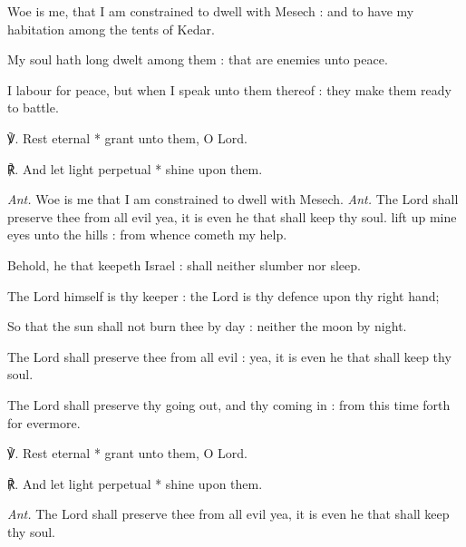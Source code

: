 Woe is me, that I am constrained to dwell with Mesech : and to have my habitation among the tents of Kedar.\par
{}My soul hath long dwelt among them : that are enemies unto peace.\par
{}I labour for peace, but when I speak unto them thereof : they make them ready to battle.\par
℣. Rest eternal * grant unto them, O Lord.\par
℟. And let light perpetual * shine upon them.\par\noindent
\textit{Ant.} Woe is me that I am constrained to dwell with Mesech.
\noindent
\textit{Ant.} The Lord {\dag} shall preserve thee from all evil yea, it is even he that shall keep thy soul.
 lift up mine eyes unto the hills : from whence cometh my help.\par
{}
Behold, he that keepeth Israel : shall neither slumber nor sleep.\par
{}The Lord himself is thy keeper : the Lord is thy defence upon thy right hand;\par
{}So that the sun shall not burn thee by day : neither the moon by night.\par
{}The Lord shall preserve thee from all evil : yea, it is even he that shall keep thy soul.\par
{}The Lord shall preserve thy going out, and thy coming in : from this time forth for evermore.
\par
℣. Rest eternal * grant unto them, O Lord.\par
℟. And let light perpetual * shine upon them.\par\noindent
\textit{Ant.} The Lord shall preserve thee from all evil yea, it is even he that shall keep thy soul.

